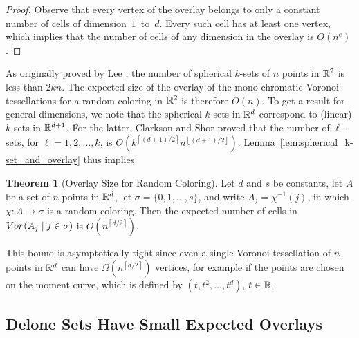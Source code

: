 \documentclass[a4paper]{article}
\newcommand {\mm}[1]   {\ifmmode{#1}\else{\mbox{\(#1\)}}\fi}
\newcommand {\ceiling}[1] {{\left\lceil #1 \right\rceil}}
\newcommand {\floor}[1] {{\left\lfloor #1 \right\rfloor}}
\newcommand{\Rspace}        {\mm{{\mathbb R}}}
\newcommand{\Overlay}[3]    {\mm{{\rm Vor}_{#1}{({#2}\mid{#3})}}}
\theoremstyle{definition}
\newtheorem{theorem}{Theorem}
\numberwithin{theorem}{section}
\numberwithin{equation}{section}
\begin{document}
\begin{proof}
  \medskip
  Observe that every vertex of the overlay belongs to only a constant number of cells of dimension~$1$~to~$d$.
  Every such cell has at least one vertex, which implies that the number of cells of any dimension in the overlay is $O(n^e)$.
\end{proof}

As originally proved by Lee \cite{Lee82}, the number of spherical $k$-sets of $n$ points in $\Rspace^2$ is less than $2kn$.
The expected size of the overlay of the mono-chromatic Voronoi tessellations for a random coloring in $\Rspace^2$ is therefore $O(n)$.
To get a result for general dimensions, we note that the spherical $k$-sets in $\Rspace^d$ correspond to (linear) $k$-sets in $\Rspace^{d+1}$.
For the latter, Clarkson and Shor \cite{ClSh89} proved that the number of $\ell$-sets, for $\ell = 1, 2, \ldots, k$, is $O( k^{\ceiling{(d+1)/2}} n^{\floor{(d+1)/2}} )$.
Lemma~\ref{lem:spherical_k-set_and_overlay} thus implies
\begin{theorem}[Overlay Size for Random Coloring]
  \label{thm:overlay_size_for_random_coloring}
  Let $d$ and $s$ be constants, let $A$ be a set of $n$ points in $\Rspace^d$, let $\sigma = \{0,1,\ldots,s\}$, and write $A_j = \chi^{-1} (j)$, in which $\chi \colon A \to \sigma$ is a random coloring.
  Then the expected number of cells in $\Overlay{}{A_j}{j \in \sigma}$ is $O( n^{\ceiling{d/2}})$.
\end{theorem}
This bound is asymptotically tight since even a single Voronoi tessellation of $n$ points in $\Rspace^d$ can have $\Omega (n^{\ceiling{d/2}})$ vertices, for example if the points are chosen on the moment curve, which is defined by $(t, t^2, \ldots, t^d)$, $t \in \Rspace$.

\subsection{Delone Sets Have Small Expected Overlays}
\label{sec:4.2}
\end{document}
